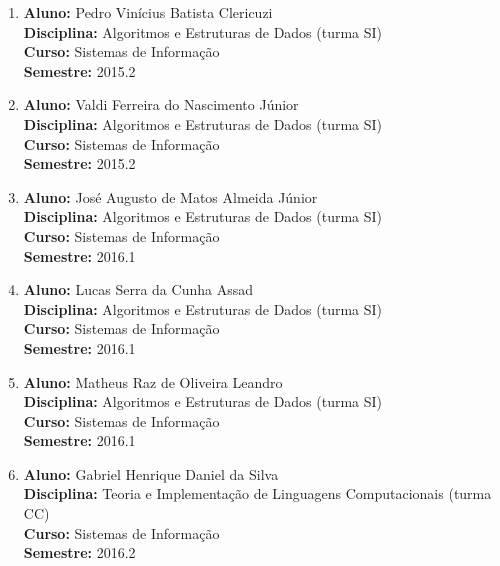 \documentclass[a4paper,oneside,10pt]{article}
\begin{document}
\begin{enumerate}
\item   \textbf{Aluno:} Pedro Vinícius Batista Clericuzi \mbox{} \\
        \textbf{Disciplina:}  Algoritmos e Estruturas de Dados (turma SI)\\
        \textbf{Curso:} Sistemas de Informação\\
        \textbf{Semestre:} 2015.2

\item   \textbf{Aluno:} Valdi Ferreira do Nascimento Júnior \mbox{} \\
        \textbf{Disciplina:}  Algoritmos e Estruturas de Dados (turma SI)\\
        \textbf{Curso:} Sistemas de Informação\\
        \textbf{Semestre:} 2015.2


\item   \textbf{Aluno:} José Augusto de Matos Almeida Júnior \mbox{} \\
        \textbf{Disciplina:}  Algoritmos e Estruturas de Dados (turma SI)\\
        \textbf{Curso:} Sistemas de Informação\\
        \textbf{Semestre:} 2016.1

\item   \textbf{Aluno:} Lucas Serra da Cunha Assad \mbox{} \\
        \textbf{Disciplina:}  Algoritmos e Estruturas de Dados (turma SI)\\
        \textbf{Curso:} Sistemas de Informação\\
        \textbf{Semestre:} 2016.1

\item   \textbf{Aluno:} Matheus Raz de Oliveira Leandro \mbox{} \\
        \textbf{Disciplina:}  Algoritmos e Estruturas de Dados (turma SI)\\
        \textbf{Curso:} Sistemas de Informação\\
        \textbf{Semestre:} 2016.1

\item   \textbf{Aluno:} Gabriel Henrique Daniel da Silva \mbox{} \\
        \textbf{Disciplina:}  Teoria e Implementação de Linguagens Computacionais (turma CC)\\
        \textbf{Curso:} Sistemas de Informação\\
        \textbf{Semestre:} 2016.2


\end{enumerate}
\end{document}
